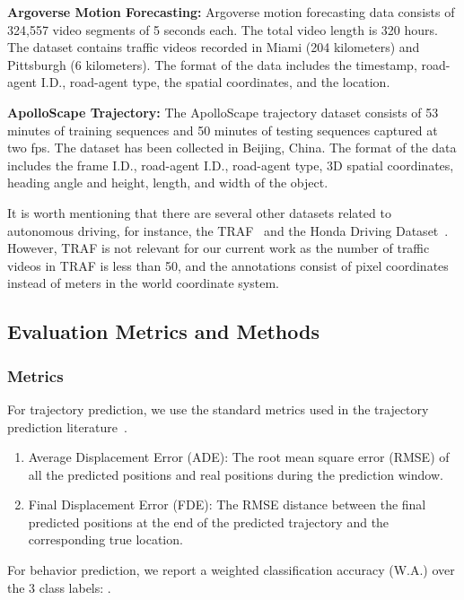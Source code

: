 \documentclass[10pt,twocolumn,letterpaper]{article}
\theoremstyle{plain}
\begin{document}
\noindent \textbf{Argoverse Motion Forecasting: } Argoverse motion forecasting data consists of 324,557 video segments of 5 seconds each. The total video length is 320 hours. The dataset contains traffic videos recorded in Miami (204 kilometers) and Pittsburgh (6 kilometers). The format of the data includes the timestamp, road-agent I.D., road-agent type, the spatial coordinates, and the location.

\noindent \textbf{ApolloScape Trajectory:} The ApolloScape trajectory dataset consists of 53 minutes of training sequences and 50 minutes of testing sequences captured at two fps. The dataset has been collected in Beijing, China. The format of the data includes the frame I.D., road-agent I.D., road-agent type, 3D spatial coordinates, heading angle and height, length, and width of the object.

It is worth mentioning that there are several other datasets related to autonomous driving, for instance, the TRAF~\cite{traphic} and the Honda Driving Dataset~\cite{honda}. However, TRAF is not relevant for our current work as the number of traffic videos in TRAF is less than 50, and the annotations consist of pixel coordinates instead of meters in the world coordinate system. 
\subsection{Evaluation Metrics and Methods}
\label{subsec: eval_metrics_methods}
\subsubsection{Metrics}
For trajectory prediction, we use the standard metrics used in the trajectory prediction literature~\cite{social-lstm,social-gan,traphic,nachiket,chandra2019robusttp}.
\begin{enumerate}[noitemsep]
    \item Average Displacement Error (ADE): The root mean square error (RMSE) of all the predicted positions and real positions during the prediction window.
    \item Final Displacement Error (FDE): The RMSE distance between the final predicted positions at the end of the predicted trajectory and the corresponding true location.
\end{enumerate}

For behavior prediction, we report a weighted classification accuracy (W.A.) over the 3 class labels: . 
\vspace{-5pt}
\end{document}

